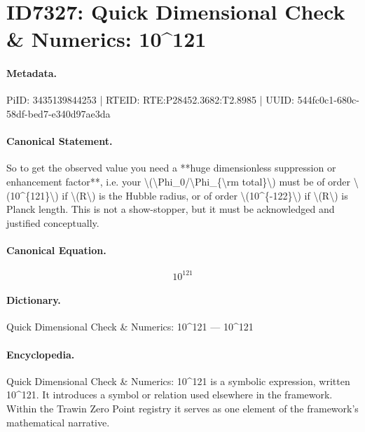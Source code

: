 \section*{ID7327: Quick Dimensional Check \& Numerics: 10\textasciicircum{}121}
\paragraph{Metadata.}
PiID: 3435139844253 | RTEID: RTE:P28452.3682:T2.8985 | UUID: 544fc0c1-680c-58df-bed7-e340d97ae3da

\paragraph{Canonical Statement.}
So to get the observed value you need a **huge dimensionless suppression or enhancement factor**, i.e. your \textbackslash{}(\textbackslash{}Phi\_0/\textbackslash{}Phi\_\{\textbackslash{}rm total\}\textbackslash{}) must be of order \textbackslash{}(10\textasciicircum{}\{121\}\textbackslash{}) if \textbackslash{}(R\textbackslash{}) is the Hubble radius, or of order \textbackslash{}(10\textasciicircum{}\{-122\}\textbackslash{}) if \textbackslash{}(R\textbackslash{}) is Planck length. This is not a show-stopper, but it must be acknowledged and justified conceptually.

\paragraph{Canonical Equation.}
\[
10^{121}
\]

\paragraph{Dictionary.}
Quick Dimensional Check \& Numerics: 10\textasciicircum{}121 — 10\textasciicircum{}121

\paragraph{Encyclopedia.}
Quick Dimensional Check \& Numerics: 10\textasciicircum{}121 is a symbolic expression, written 10\textasciicircum{}121. It introduces a symbol or relation used elsewhere in the framework. Within the Trawin Zero Point registry it serves as one element of the framework's mathematical narrative.
